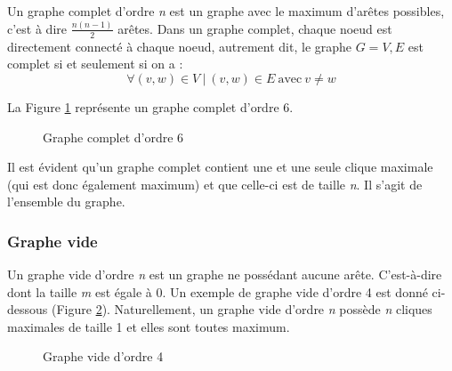 \documentclass[12pt,a4paper]{article}
\begin{document}
Un graphe complet d'ordre \emph{n} est un graphe avec le maximum d'arêtes possibles, c'est à dire \(\frac{n(n-1)}{2}\) arêtes. Dans un graphe complet, chaque noeud est directement connecté à chaque noeud, autrement dit, le graphe \(G = V, E\) est complet si et seulement si on a :
\begin{equation}
\forall (v,w) \in V \ | \ (v, w) \in E \ \text{avec} \ v \neq w
\end{equation}

La Figure \ref{fig:k6} représente un graphe complet d'ordre 6.

\begin{figure}[h!]
    \centering
    \caption{Graphe complet d'ordre 6}
    \label{fig:k6}
\end{figure}

Il est évident qu'un graphe complet contient une et une seule clique maximale (qui est donc également maximum) et que celle-ci est de taille \emph{n}. Il s'agit de l'ensemble du graphe.

\subsubsection*{Graphe vide}
\label{subsubsec:vide}

Un graphe vide d'ordre \emph{n} est un graphe ne possédant aucune arête. C'est-à-dire dont la taille \emph{m} est égale à 0. Un exemple de graphe vide d'ordre 4 est donné ci-dessous (Figure \ref{fig:vide}).
Naturellement, un graphe vide d'ordre \emph{n} possède \emph{n} cliques maximales de taille 1 et elles sont toutes maximum.

\begin{figure}[h!]
  \centering
  \caption{Graphe vide d'ordre 4}
  \label{fig:vide}
\end{figure}
\end{document}
